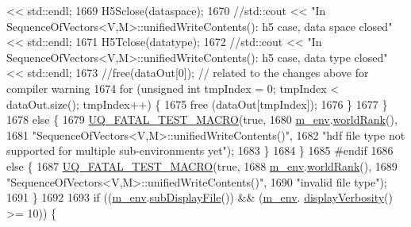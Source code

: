 \begin{DoxyCode}
{       << std::endl;}
1669               H5Sclose(dataspace);
1670               \textcolor{comment}{//std::cout << "In SequenceOfVectors<V,M>::unifiedWriteContents(): h5 case, data space
       closed" << std::endl;}
1671               H5Tclose(datatype);
1672               \textcolor{comment}{//std::cout << "In SequenceOfVectors<V,M>::unifiedWriteContents(): h5 case, data type closed"
       << std::endl;}
1673               \textcolor{comment}{//free(dataOut[0]); // related to the changes above for compiler warning}
1674               \textcolor{keywordflow}{for} (\textcolor{keywordtype}{unsigned} \textcolor{keywordtype}{int} tmpIndex = 0; tmpIndex < dataOut.size(); tmpIndex++) \{
1675                 free (dataOut[tmpIndex]);
1676               \}
1677             \}
1678             \textcolor{keywordflow}{else} \{
1679               \hyperlink{_defines_8h_a56d63d18d0a6d45757de47fcc06f574d}{UQ\_FATAL\_TEST\_MACRO}(\textcolor{keyword}{true},
1680                                   \hyperlink{class_q_u_e_s_o_1_1_base_vector_sequence_a8e8824d2a63c5a43bcc6473e3a0491e8}{m\_env}.\hyperlink{class_q_u_e_s_o_1_1_base_environment_a78b57112bbd0e6dd0e8afec00b40ffa7}{worldRank}(),
1681                                   \textcolor{stringliteral}{"SequenceOfVectors<V,M>::unifiedWriteContents()"},
1682                                   \textcolor{stringliteral}{"hdf file type not supported for multiple sub-environments yet"});
1683             \}
1684           \}
1685 \textcolor{preprocessor}{#endif}
1686 \textcolor{preprocessor}{}          \textcolor{keywordflow}{else} \{
1687             \hyperlink{_defines_8h_a56d63d18d0a6d45757de47fcc06f574d}{UQ\_FATAL\_TEST\_MACRO}(\textcolor{keyword}{true},
1688                                 \hyperlink{class_q_u_e_s_o_1_1_base_vector_sequence_a8e8824d2a63c5a43bcc6473e3a0491e8}{m\_env}.\hyperlink{class_q_u_e_s_o_1_1_base_environment_a78b57112bbd0e6dd0e8afec00b40ffa7}{worldRank}(),
1689                                 \textcolor{stringliteral}{"SequenceOfVectors<V,M>::unifiedWriteContents()"},
1690                                 \textcolor{stringliteral}{"invalid file type"});
1691           \}
1692 
1693           \textcolor{keywordflow}{if} ((\hyperlink{class_q_u_e_s_o_1_1_base_vector_sequence_a8e8824d2a63c5a43bcc6473e3a0491e8}{m\_env}.\hyperlink{class_q_u_e_s_o_1_1_base_environment_a8a0064746ae8dddfece4229b9ad374d6}{subDisplayFile}()) && (\hyperlink{class_q_u_e_s_o_1_1_base_vector_sequence_a8e8824d2a63c5a43bcc6473e3a0491e8}{m\_env}.
      \hyperlink{class_q_u_e_s_o_1_1_base_environment_a1fe5f244fc0316a0ab3e37463f108b96}{displayVerbosity}() >= 10)) \{

\end{DoxyCode}
